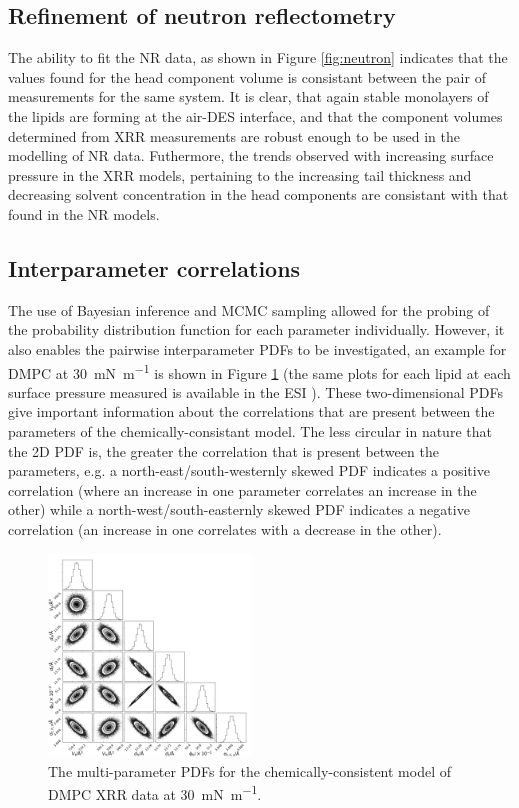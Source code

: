 \documentclass[amsmath,amssymb,twocolumn,superscriptaddress]{revtex4-1}
\begin{document}
\subsection{Refinement of neutron reflectometry}
%
The ability to fit the NR data, as shown in Figure \ref{fig:neutron} indicates that the values found for the head component volume is consistant between the pair of measurements for the same system.
It is clear, that again stable monolayers of the lipids are forming at the air-DES interface, and that the component volumes determined from XRR measurements are robust enough to be used in the modelling of NR data.
Futhermore, the trends observed with increasing surface pressure in the XRR models, pertaining to the increasing tail thickness and decreasing solvent concentration in the head components are consistant with that found in the NR models.

\subsection{Interparameter correlations}
%
The use of Bayesian inference and MCMC sampling allowed for the probing of the probability distribution function for each parameter individually.
However, it also enables the pairwise interparameter PDFs to be investigated, an example for DMPC at \SI{30}{\milli\newton\per\meter} is shown in Figure \ref{fig:dmpcpdfs} (the same plots for each lipid at each surface pressure measured is available in the ESI \cite{SI2019}).
These two-dimensional PDFs give important information about the correlations that are present between the parameters of the chemically-consistant model.
The less circular in nature that the 2D PDF is, the greater the correlation that is present between the parameters, e.g. a north-east/south-westernly skewed PDF indicates a positive correlation (where an increase in one parameter correlates an increase in the other) while a north-west/south-easternly skewed PDF indicates a negative correlation (an increase in one correlates with a decrease in the other).
%
\begin{figure}
	\centering
	\includegraphics[width=0.48\textwidth]{figures/dmpc3_all_corner}
	\caption{The multi-parameter PDFs for the chemically-consistent model of DMPC XRR data at \SI{30}{\milli\newton\per\meter}.}
	\label{fig:dmpcpdfs}
\end{figure}
%
\end{document}
